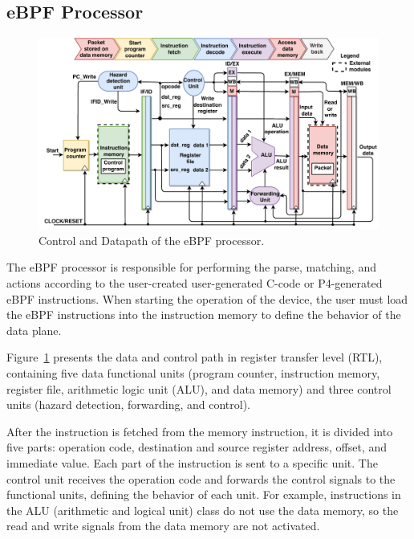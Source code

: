 \subsection{eBPF Processor}

\begin{figure}[t]
\centering
\includegraphics[width=.9\textwidth]{figures/06_fig02.pdf}
\caption{Control and Datapath of the eBPF processor.}
\label{fig:06_fig02}
\end{figure}


The eBPF processor is responsible for performing the parse, matching, and actions according to the user-created user-generated C-code or P4-generated eBPF instructions. When starting the operation of the device, the user must load the eBPF instructions into the instruction memory to define  the behavior of the data plane.

Figure~\ref{fig:06_fig02} presents the data and control path in register transfer level (RTL), containing five data functional units (program counter, instruction memory, register file, arithmetic logic unit (ALU), and data memory) and three control units (hazard detection, forwarding, and control).

After the instruction is fetched from the memory instruction, it is divided into five parts: operation code, destination and source register address, offset, and immediate value. Each part of the instruction is sent to a specific unit. The control unit receives the operation code and forwards the control signals to the functional units, defining the behavior of each unit. For example, instructions in the ALU (arithmetic and logical unit) class do not use the data memory, so the read and write signals from the data memory are not activated.

